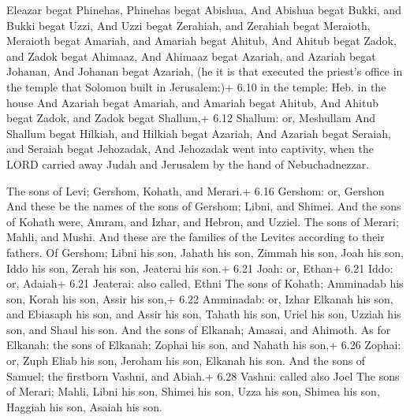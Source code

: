  Eleazar begat Phinehas, Phinehas begat Abishua,
 And Abishua begat Bukki, and Bukki begat Uzzi, 
And Uzzi begat Zerahiah, and Zerahiah begat Meraioth, 
Meraioth begat Amariah, and Amariah begat Ahitub,  And
Ahitub begat Zadok, and Zadok begat Ahimaaz,  And Ahimaaz
begat Azariah, and Azariah begat Johanan,  And Johanan
begat Azariah, (he it is that executed the priest's office in the temple
that Solomon built in Jerusalem:)+ 6.10 in the temple: Heb. in the house
 And Azariah begat Amariah, and Amariah begat Ahitub,
 And Ahitub begat Zadok, and Zadok begat Shallum,+ 6.12
Shallum: or, Meshullam  And Shallum begat Hilkiah, and
Hilkiah begat Azariah,  And Azariah begat Seraiah, and
Seraiah begat Jehozadak,  And Jehozadak went into
captivity, when the LORD carried away Judah and Jerusalem by the hand of
Nebuchadnezzar.

 The sons of Levi; Gershom, Kohath, and Merari.+ 6.16
Gershom: or, Gershon  And these be the names of the sons of
Gershom; Libni, and Shimei.  And the sons of Kohath were,
Amram, and Izhar, and Hebron, and Uzziel.  The sons of
Merari; Mahli, and Mushi. And these are the families of the Levites
according to their fathers.  Of Gershom; Libni his son,
Jahath his son, Zimmah his son,  Joah his son, Iddo his
son, Zerah his son, Jeaterai his son.+ 6.21 Joah: or, Ethan+ 6.21 Iddo:
or, Adaiah+ 6.21 Jeaterai: also called, Ethni  The sons of
Kohath; Amminadab his son, Korah his son, Assir his son,+ 6.22
Amminadab: or, Izhar  Elkanah his son, and Ebiasaph his
son, and Assir his son,  Tahath his son, Uriel his son,
Uzziah his son, and Shaul his son.  And the sons of
Elkanah; Amasai, and Ahimoth.  As for Elkanah: the sons of
Elkanah; Zophai his son, and Nahath his son,+ 6.26 Zophai: or, Zuph
 Eliab his son, Jeroham his son, Elkanah his son.
 And the sons of Samuel; the firstborn Vashni, and Abiah.+
6.28 Vashni: called also Joel  The sons of Merari; Mahli,
Libni his son, Shimei his son, Uzza his son,  Shimea his
son, Haggiah his son, Asaiah his son.

